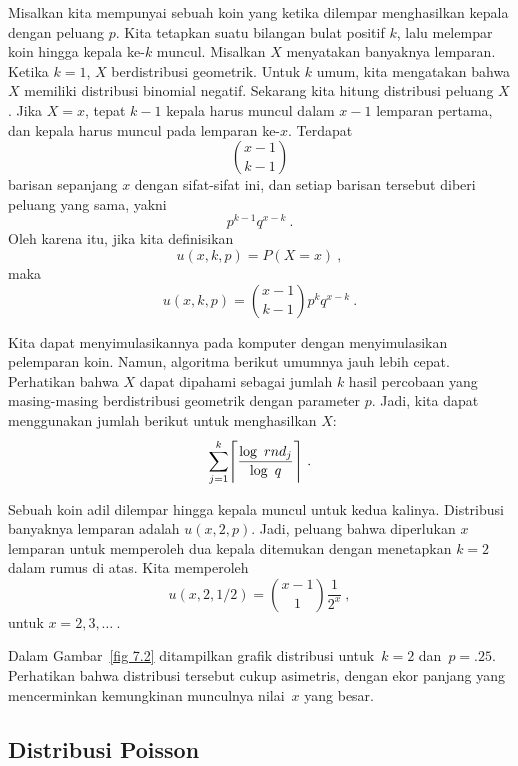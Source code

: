 Misalkan kita mempunyai sebuah koin yang ketika dilempar menghasilkan kepala dengan
peluang $p$. Kita tetapkan suatu bilangan bulat positif $k$, lalu melempar koin hingga
kepala ke-$k$ muncul. Misalkan $X$ menyatakan banyaknya lemparan. Ketika $k = 1$, $X$
berdistribusi geometrik. Untuk $k$ umum, kita mengatakan bahwa $X$ memiliki distribusi
binomial negatif. Sekarang kita hitung distribusi peluang $X$. Jika $X = x$, tepat
$k-1$ kepala harus muncul dalam $x-1$ lemparan pertama, dan kepala harus muncul pada
lemparan ke-$x$. Terdapat
$${{x-1}\choose{k-1}}$$ 
barisan sepanjang $x$ dengan sifat-sifat ini, dan setiap barisan tersebut diberi peluang
yang sama, yakni
$$p^{k-1}q^{x-k}\ .$$ Oleh karena itu, jika kita definisikan
$$u(x, k, p) = P(X = x)\ ,$$
maka
$$u(x, k, p) = {{x-1}\choose{k-1}}p^kq^{x-k}\ .$$
\par Kita dapat menyimulasikannya pada komputer dengan menyimulasikan pelemparan koin.
Namun, algoritma berikut umumnya jauh lebih cepat. Perhatikan bahwa $X$ dapat dipahami
sebagai jumlah $k$ hasil percobaan yang masing-masing berdistribusi geometrik dengan
parameter $p$. Jadi, kita dapat menggunakan jumlah berikut untuk menghasilkan $X$:
$$\sum_{j = 1}^k \Biggl\lceil {{\log\ rnd_j}\over{\log\ q}}\Biggr\rceil\ .$$

\begin{example} Sebuah koin adil dilempar hingga kepala muncul untuk kedua kalinya.
Distribusi banyaknya lemparan adalah $u(x, 2, p)$. Jadi, peluang bahwa diperlukan $x$
lemparan untuk memperoleh dua kepala ditemukan dengan menetapkan $k = 2$ dalam rumus di
atas. Kita memperoleh
$$  u(x, 2, 1/2) =  {{x-1} \choose 1} \frac 1{2^x}\ ,$$ 
untuk $x = 2, 3, \ldots\ $.
\par
Dalam Gambar~\ref{fig 7.2} ditampilkan grafik distribusi untuk~$k = 2$ dan~$p = .25$.
Perhatikan bahwa distribusi tersebut cukup asimetris, dengan ekor panjang yang
mencerminkan kemungkinan munculnya nilai~$x$ yang besar.
\end{example}



\subsection*{Distribusi Poisson}

